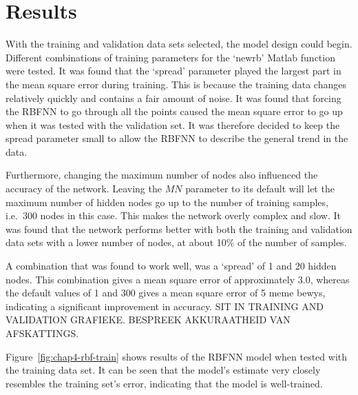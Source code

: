\section{Results}

With the training and validation data sets selected, the model design could begin. Different combinations of training parameters for the `newrb' Matlab function were tested. It was found that the `spread' parameter played the largest part in the mean square error during training. This is because the training data changes relatively quickly and contains a fair amount of noise. It was found that forcing the RBFNN to go through all the points caused the mean square error to go up when it was tested with the validation set. It was therefore decided to keep the spread parameter small to allow the RBFNN to describe the general trend in the data. 

Furthermore, changing the maximum number of nodes also influenced the accuracy of the network. Leaving the $MN$ parameter to its default will let the maximum number of hidden nodes go up to the number of training samples, i.e.\ 300 nodes in this case. This makes the network overly complex and slow. It was found that the network performs better with both the training and validation data sets with a lower number of nodes, at about 10\% of the number of samples. 

A combination that was found to work well, was a `spread' of 1 and 20 hidden nodes. This combination gives a mean square error of approximately 3.0, whereas the default values of 1 and 300 gives a mean square error of 5 meme bewys, indicating a significant improvement in accuracy. SIT IN TRAINING AND VALIDATION GRAFIEKE. BESPREEK AKKURAATHEID VAN AFSKATTINGS.  

Figure~\ref{fig:chap4-rbf-train} shows results of the RBFNN model when tested with the training data set. It can be seen that the model's estimate very closely resembles the training set's error, indicating that the model is well-trained. 


